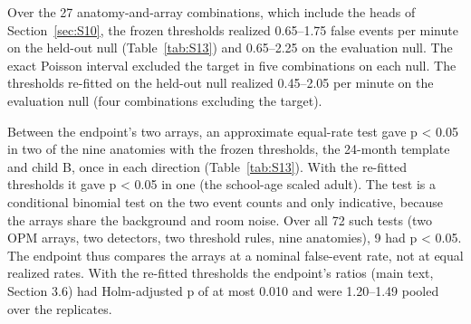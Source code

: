 \documentclass[preprint,12pt,authoryear,a4paper]{elsarticle}
\begin{document}
Over the 27 anatomy-and-array combinations, which include the heads of Section~\ref{sec:S10}, the frozen thresholds realized 0.65–1.75 false events per minute on the held-out null (Table~\ref{tab:S13}) and 0.65–2.25 on the evaluation null. The exact Poisson interval excluded the target in five combinations on each null. The thresholds re-fitted on the held-out null realized 0.45–2.05 per minute on the evaluation null (four combinations excluding the target).

Between the endpoint's two arrays, an approximate equal-rate test gave p < 0.05 in two of the nine anatomies with the frozen thresholds, the 24-month template and child B, once in each direction (Table~\ref{tab:S13}). With the re-fitted thresholds it gave p < 0.05 in one (the school-age scaled adult). The test is a conditional binomial test on the two event counts and only indicative, because the arrays share the background and room noise. Over all 72 such tests (two OPM arrays, two detectors, two threshold rules, nine anatomies), 9 had p < 0.05. The endpoint thus compares the arrays at a nominal false-event rate, not at equal realized rates. With the re-fitted thresholds the endpoint's ratios (main text, Section 3.6) had Holm-adjusted p of at most 0.010 and were 1.20–1.49 pooled over the replicates.
\end{document}
